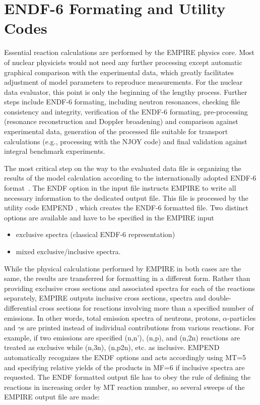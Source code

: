 \section{ENDF-6 Formating and Utility Codes\label{Sec:utility-codes}}

Essential reaction calculations are performed by the EMPIRE physics core.
Most of nuclear physicists would not need any further processing except
automatic graphical comparison with the experimental data, which greatly
facilitates adjustment of model parameters to reproduce measurements. For
the nuclear data evaluator, this point is only the beginning of the lengthy
process. Further steps include ENDF-6 formating, including neutron
resonances, checking file consistency and integrity, verification of the
ENDF-6 formating, pre-processing (resonance reconstruction and Doppler
broadening) and comparison against experimental data, generation of the
processed file suitable for transport calculations (e.g., processing with
the NJOY code) and final validation against integral benchmark experiments.

The most critical step on the way to the evaluated data file is organizing
the results of the model calculation according to the internationally
adopted ENDF-6 format~\cite{Herman:05a}. The ENDF option in the input file
instructs EMPIRE to write all necessary information to the dedicated output
file. This file is processed by the utility code EMPEND%
, which creates the ENDF-6 formatted file. Two distinct
options are available and have to be specified in the EMPIRE input

\begin{itemize}
\item exclusive spectra (classical ENDF-6 representation)

\item mixed exclusive/inclusive spectra.
\end{itemize}

While the physical calculations performed by EMPIRE in both cases are the
same, the results are transferred for formatting in a different form. Rather
than providing exclusive cross sections and associated spectra for each of
the reactions separately, EMPIRE outputs inclusive cross sections, spectra
and double-differential cross sections for reactions involving more than a
specified number of emissions. In other words, total emission spectra of
neutrons, protons, $\alpha$-particles and $\gamma$s are printed instead of
individual contributions from various reactions. For example, if two
emissions are specified (n,n'), (n,p), and (n,2n) reactions are treated as
exclusive while (n,3n), (n,p2n), etc. as inclusive. EMPEND automatically
recognizes the ENDF options and acts accordingly using MT=5 and specifying
relative yields of the products in MF=6 if inclusive spectra are requested.
The ENDF formatted output file has to obey the rule of defining the
reactions in increasing order by MT reaction number, so several sweeps of
the EMPIRE output file are made:

